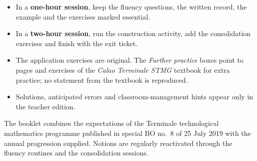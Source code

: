 \documentclass[11pt,a4paper,openany]{book}
\begin{document}
\begin{itemize}
\item In a \textbf{one-hour session}, keep the fluency questions, the written record, the example and the exercises marked essential.
\item In a \textbf{two-hour session}, run the construction activity, add the consolidation exercises and finish with the exit ticket.
\item The application exercises are original. The \emph{Further practice} boxes point to pages and exercises of the \emph{Calao Terminale STMG} textbook for extra practice; no statement from the textbook is reproduced.
\item Solutions, anticipated errors and classroom-management hints appear only in the teacher edition.
\end{itemize}

\begin{retenir}
The booklet combines the expectations of the Terminale technological mathematics programme published in special BO no.~8 of 25 July 2019 with the annual progression supplied. Notions are regularly reactivated through the fluency routines and the consolidation sessions.
\end{retenir}

\tableofcontents
\mainmatter












\appendix




\end{document}
